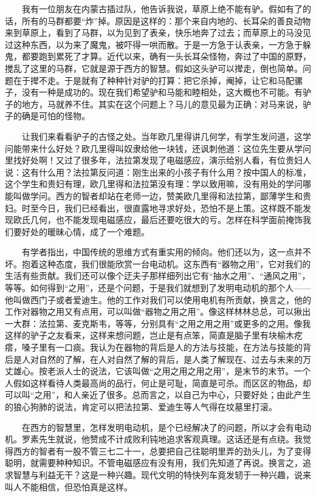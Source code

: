 　　我有一位朋友在内蒙古插过队，他告诉我说，草原上绝不能有驴。假如有了的话，所有的马群都要“炸”掉。原因是这样的：那个来自内地的、长耳朵的善良动物来到草原上，看到了马群，以为见到了表亲，快乐地奔了过去；而草原上的马没见过这种东西，以为来了魔鬼，被吓得一哄而散。于是一方急于认表亲，一方急于躲鬼，都要跑到累死了才算。近代以来，确有一头长耳朵怪物，奔过了中国的原野，搅乱了这里的马群，它就是源于西方的智慧。假如这头驴可以撵走，倒也简单。问题在于撵不走。于是就有了种种针对驴的打算：把它杀掉，阉掉，让它和马配骡子，没有一种是成功的。现在我们希望驴和马能和睦相处，这大概也不可能。有驴子的地方，马就养不住。其实在这个问题上？马儿的意见最为正确：对马来说，驴子的确是可怕的怪物。 

　　让我们来看看驴子的古怪之处。当年欧几里得讲几何学，有学生发问道，这学问能带来什么好处？欧几里得叫奴隶给他一块钱，还讽刺他道：这位先生要从学问里找好处啊！又过了很多年，法拉第发现了电磁感应，演示给别人看，有位贵妇人说：这有什么用？法拉第反问道：刚生出来的小孩子有什么用？按中国人的标准，这个学生和贵妇有理，欧几里得和法拉第没有理：学以致用嘛，没有用处的学问哪能叫做学问。西方的智者却站在老师一边，赞美欧几里得和法拉第，鄙薄学生和贵妇。时至今日，我们已经看出，很直露地寻求好处，恐怕不是上策。这样既不能发现欧氏几何，也不能发现电磁感应，最后还要吃很大的亏。怎样在科学面前掩饰我们要好处的暖昧心情，成了一个难题。 

　　有学者指出，中国传统的思维方式有重实用的倾向。他们还以为，这一点并不坏。抱着这种态度，我们很能欣赏一台电动机。这东西有“器物之用”，它对我们的生活有些贡献。我们还可以像个迂夫子那样细列出它有“抽水之用”、“通风之用”，等等。如何得到“之用”，还是个问题，于是我们就想到了发明电动机的那个人——他叫做西门子或者爱迪生。他的工作对我们可以使用电机有所贡献，换言之，他的工作对器物之用又有点用，可以叫做“器物之用之用”。像这样林林总总，可以揪出一大群：法拉第、麦克斯韦，等等，分别具有“之用之用之用”或更多的之用。像我这样的驴子之友看来，这样来想问题，岂止是有点笨，简直是脑子里有块榆木疙瘩，嗓子里有一口痰。我认为在器物的背后是人的方法与技能，在方法与技能的背后是人对自然的了解，在人对自然了解的背后，是人类了解现在、过去与未来的万丈雄心。按老派人士的说法，它该叫做“之用之用之用之用”，是末节的末节。一个人假如这样看待人类最高尚的品行，何止是可耻，简直是可杀。而区区的物品，却可以叫“之用”，和人亲近了很多。总而言之，以自己为中心，只要好处；由此产生的狼心狗肺的说法，肯定可以把法拉第、爱迪生等人气得在坟墓里打滚。 

　　在西方的智慧里，怎样发明电动机，是个已经解决了的问题，所以才会有电动机。罗素先生就说，他赞成不计成败利钝地追求客观真理。这话还是有点绕。我觉得西方的智者有一股不管三七二十一，总要把自己往聪明里弄的劲头儿，为了变得聪明，就需要种种知识。不管电磁感应有没有用，我们先知道了再说。换言之，追求智慧与利益无干？这是一种兴趣。现代文明的特快列车竟发轫于一种兴趣，说来叫人不能相信，但恐怕真是这样。 

